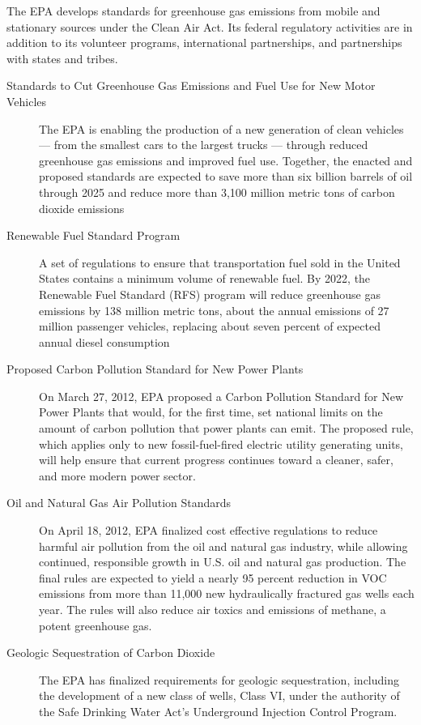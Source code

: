 The EPA develops standards for greenhouse gas emissions from mobile and stationary sources under the Clean Air Act. Its federal regulatory activities are in addition to its volunteer programs, international partnerships, and partnerships with states and tribes.
\begin{description}
	\item [Standards to Cut Greenhouse Gas Emissions and Fuel Use for New Motor Vehicles] The EPA is enabling the production of a new generation of clean vehicles --- from the smallest cars to the largest trucks --- through reduced greenhouse gas emissions and improved fuel use. Together, the enacted and proposed standards are expected to save more than six billion barrels of oil through 2025 and reduce more than 3,100 million metric tons of carbon dioxide emissions
	\item [Renewable Fuel Standard Program] A set of regulations to ensure that transportation fuel sold in the United States contains a minimum volume of renewable fuel. By 2022, the Renewable Fuel Standard (RFS) program will reduce greenhouse gas emissions by 138 million metric tons, about the annual emissions of 27 million passenger vehicles, replacing about seven percent of expected annual diesel consumption
	\item [Proposed Carbon Pollution Standard for New Power Plants] On March 27, 2012, EPA proposed a Carbon Pollution Standard for New Power Plants that would, for the first time, set national limits on the amount of carbon pollution that power plants can emit. The proposed rule, which applies only to new fossil-fuel-fired electric utility generating units, will help ensure that current progress continues toward a cleaner, safer, and more modern power sector.
	\item [Oil and Natural Gas Air Pollution Standards] On April 18, 2012, EPA finalized cost effective regulations to reduce harmful air pollution from the oil and natural gas industry, while allowing continued, responsible growth in U.S. oil and natural gas production. The final rules are expected to yield a nearly 95 percent reduction in VOC emissions from more than 11,000 new hydraulically fractured gas wells each year. The rules will also reduce air toxics and emissions of methane, a potent greenhouse gas.
	\item [Geologic Sequestration of Carbon Dioxide] The EPA has finalized requirements for geologic sequestration, including the development of a new class of wells, Class VI, under the authority of the Safe Drinking Water Act's Underground Injection Control Program. 
\end{description}



